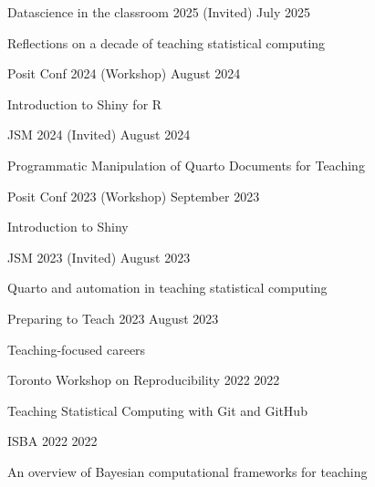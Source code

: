 \documentclass[margin,line]{res}
\begin{document}
\begin{resume}
Datascience in the classroom 2025 (Invited) \hfill July 2025
\begin{list1}
\item[] Reflections on a decade of teaching statistical computing
\end{list1}
\vspace{-3mm}

Posit Conf 2024 (Workshop) \hfill August 2024
\begin{list1}
\item[] Introduction to Shiny for R
\end{list1}
\vspace{-3mm}

JSM 2024 (Invited) \hfill August 2024
\begin{list1}
\item[] Programmatic Manipulation of Quarto Documents for Teaching
\end{list1}
\vspace{-3mm}

Posit Conf 2023 (Workshop) \hfill September 2023
\begin{list1}
\item[] Introduction to Shiny
\end{list1}
\vspace{-3mm}

JSM 2023 (Invited) \hfill August 2023
\begin{list1}
\item[] Quarto and automation in teaching statistical computing
\end{list1}
\vspace{-3mm}

Preparing to Teach 2023 \hfill August 2023
\begin{list1}
\item[] Teaching-focused careers
\end{list1}
\vspace{-3mm}

Toronto Workshop on Reproducibility 2022 \hfill 2022
\begin{list1}
\item[] Teaching Statistical Computing with Git and GitHub
\end{list1}
\vspace{-3mm}

ISBA 2022 \hfill 2022
\begin{list1}
\item[] An overview of Bayesian computational frameworks for teaching
\end{list1}
\vspace{-3mm}


\end{resume}
\end{document}
